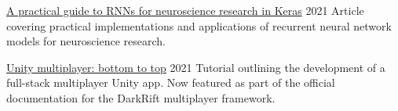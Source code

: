 

\begin{cventries}

  \cventry%
    {} %
    {\href{https://dev.to/robodoig/a-practical-guide-to-rnns-for-neuroscience-research-in-keras-1ad2}{A practical guide to RNNs for neuroscience research in Keras}} %
    {} %
    {2021} %
    {Article covering practical implementations and applications of recurrent neural network models for neuroscience research.}

  \cventry%
    {} %
    {\href{https://dev.to/robodoig/unity-multiplayer-bottom-to-top-46cj}{Unity multiplayer: bottom to top}} %
    {} %
    {2021} %
    {Tutorial outlining the development of a full-stack multiplayer Unity app. Now featured as part of the official documentation for the DarkRift multiplayer framework.}
\end{cventries}
